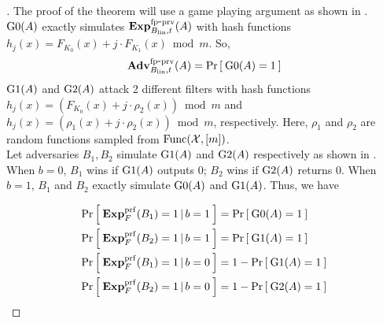 \begin{proof}[]
The proof of the theorem will use a game playing argument as shown in . $\text{G0}(A)$ exactly simulates $\mathrm{\mathbf{Exp}}^{\mathrm{fp\mbox{-}prv}}_{B_\mathrm{lin},t}(A)$ with hash functions $h_j(x) =  F_{K_0}(x) + j\cdot F_{K_1}(x) \bmod m$. So,
\begin{equation}
\mathrm{\mathbf{Adv}}^{\mathrm{fp\mbox{-}prv}}_{B_{\mathrm{lin}},t}(A) = \Pr\left[\: \text{G0}(A)=1 \:\right]\label{eq:0}
\end{equation}
 $\text{G1}(A)$ and $\text{G2}(A)$ attack 2 different filters with hash functions 
$h_j(x) = ( F_{K_0}(x) + j\cdot \rho_2(x)) \bmod m$ and $h_j(x) = ( \rho_1(x) + j \cdot \rho_2(x)) \bmod m$, respectively.
Here, $\rho_1$ and $\rho_2$ are random functions sampled from $\mathrm{Func}({\cal X},[m])$. \\
\noindent
Let adversaries $B_1, B_2$ simulate $\text{G1}(A)$ and $\text{G2}(A)$ respectively as shown in . When $b=0$, $B_1$ wins if $\text{G1}(A)$ outputs 0; $B_2$ wins if $\text{G2}(A)$ returns 0. When $b=1$, $B_1$ and $B_2$ exactly simulate $\text{G0}(A)$ and $\text{G1}(A)$. Thus, we have

\begin{align}
\Pr\left[\: \mathbf{Exp}^{\mathrm{prf}}_{F}(B_1) = 1\,|\,b=1 \:\right] &= \Pr\left[\: \text{G0}(A)=1 \:\right]\label{eq:m1}\\
\Pr\left[\: \mathbf{Exp}^{\mathrm{prf}}_{F}(B_2) = 1\,|\,b=1 \:\right] &= \Pr\left[\: \text{G1}(A)=1 \:\right]\label{eq:m2}\\
\Pr\left[\: \mathbf{Exp}^{\mathrm{prf}}_{F}(B_1) = 1\,|\,b=0 \:\right] &= 1-\Pr\left[\: \text{G1}(A)=1 \:\right]\label{eq:m3}\\
\Pr\left[\: \mathbf{Exp}^{\mathrm{prf}}_{F}(B_2) = 1\,|\,b=0 \:\right] &= 1-\Pr\left[\: \text{G2}(A)=1 \:\right]\label{eq:m4}
\end{align}


\end{proof}
